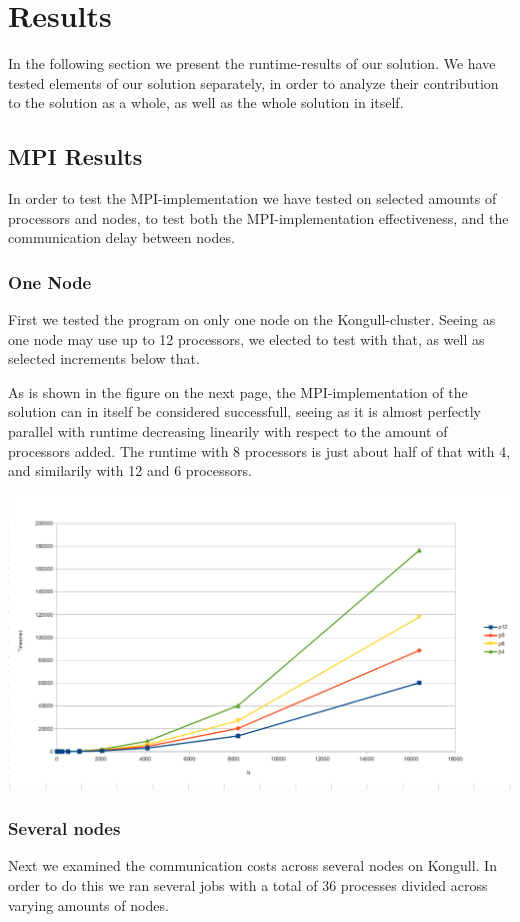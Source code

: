 \documentclass[fontsize=11pt,paper=a4,titlepage]{article}
\begin{document}
\section{Results}
In the following section we present the runtime-results of our solution.
We have tested elements of our solution separately, in order to analyze their contribution to the solution as a whole, as well as the whole solution in itself.

\subsection{MPI Results}
In order to test the MPI-implementation we have tested on selected amounts of processors and nodes, to test both the MPI-implementation effectiveness, and the communication delay between nodes.

\subsubsection{One Node}
First we tested the program on only one node on the Kongull-cluster. Seeing as one node may use up to 12 processors, we elected to test with that, as well as selected increments below that. 

As is shown in the figure on the next page, the MPI-implementation of the solution can in itself be considered successfull, seeing as it is almost perfectly parallel with runtime decreasing linearily with respect to the amount of processors added. The runtime with 8 processors is just about half of that with 4, and similarily with 12 and 6 processors.

\includegraphics[scale=0.5]{pics/pX.png}

\subsubsection{Several nodes}
Next we examined the communication costs across several nodes on Kongull.
In order to do this we ran several jobs with a total of 36 processes divided across varying amounts of nodes.
\end{document}
